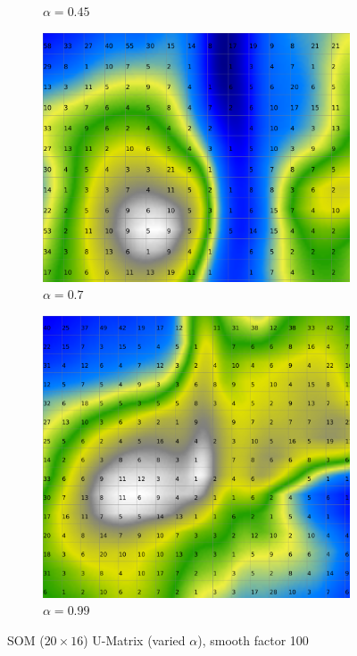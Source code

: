 \documentclass{acm_proc_article-sp}
\begin{document}
\begin{figure}
\begin{subfigure}[b]{0.24\linewidth}
        \caption{$\alpha=0.45$}
        \label{fig:wine-20x16-smoothed-data-histogram-alpha-0.45-f-100}
    \end{subfigure}
    \begin{subfigure}[b]{0.24\linewidth}
        \includegraphics[width=\linewidth]{img/wine-20x16-smoothed-data-histogram-alpha-0.7-f-100}
        \caption{$\alpha=0.7$}
        \label{fig:wine-20x16-smoothed-data-histogram-alpha-0.7-f-100}
    \end{subfigure}
    \begin{subfigure}[b]{0.24\linewidth}
        \includegraphics[width=\linewidth]{img/wine-20x16-smoothed-data-histogram-alpha-0.99-f-100}
        \caption{$\alpha=0.99$}
        \label{fig:wine-20x16-smoothed-data-histogram-alpha-0.99-f-100}
    \end{subfigure}
    \caption{SOM ($20\times16$) U-Matrix (varied $\alpha$), smooth factor 100}
    \label{fig:wine-20x16-smoothed-data-histogram-alpha-f-100}
\end{figure}
\end{document}
